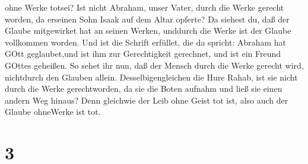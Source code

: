 ohne Werke totsei?  Ist nicht Abraham, unser Vater, durch
die Werke gerecht worden, da erseinen Sohn Isaak auf dem Altar opferte?
 Da siehest du, daß der Glaube mitgewirket hat an seinen
Werken, unddurch die Werke ist der Glaube vollkommen worden.
 Und ist die Schrift erfüllet, die da spricht: Abraham hat
GOtt geglaubet,und ist ihm zur Gerechtigkeit gerechnet, und ist ein
Freund GOttes geheißen.  So sehet ihr nun, daß der Mensch
durch die Werke gerecht wird, nichtdurch den Glauben allein.
 Desselbigengleichen die Hure Rahab, ist sie nicht durch
die Werke gerechtworden, da sie die Boten aufnahm und ließ sie einen
andern Weg hinaus?  Denn gleichwie der Leib ohne Geist tot
ist, also auch der Glaube ohneWerke ist tot.

\hypertarget{section-2}{%
\section{3}\label{section-2}}

